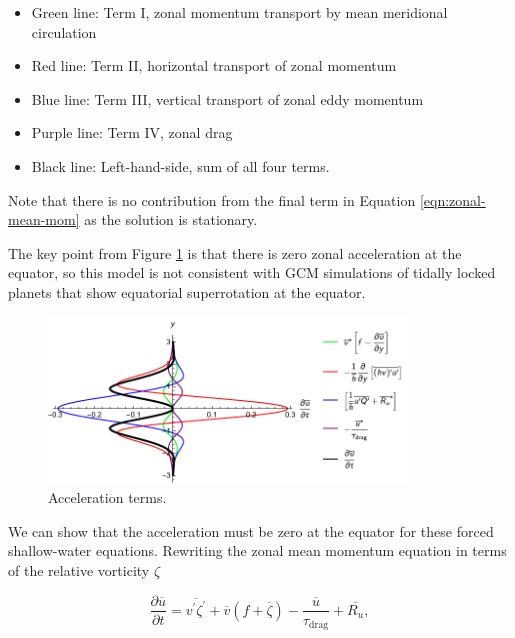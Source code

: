 \begin{itemize}
  \item Green line: Term I, zonal momentum transport by mean meridional circulation
  \item Red line: Term II, horizontal transport of zonal momentum
  \item Blue line: Term III, vertical transport of zonal eddy momentum
  \item Purple line: Term IV, zonal drag
  \item Black line: Left-hand-side, sum of all four terms.
\end{itemize}

Note that there is no contribution from the final term in Equation \ref{eqn:zonal-mean-mom} as the solution is stationary.

The key point from Figure \ref{fig:matsuno-zonal-acceleration-terms} is that there is zero zonal acceleration at the equator, so this model is not consistent with GCM simulations of tidally locked planets that show equatorial superrotation at the equator.

\begin{figure}
  \centering
  \includegraphics[width=0.85\textwidth]{figures/wave-mean-flow/matsuno-zonal-acceleration-terms.pdf}
  \caption{Acceleration terms.}
  \label{fig:matsuno-zonal-acceleration-terms}
\end{figure}


We can show that the acceleration must be zero at the equator for these forced shallow-water equations. Rewriting the zonal mean momentum equation in terms of the relative vorticity $\zeta$ \citep{thuburn1999zonalmean} \citep{showman2011superrotation}

\begin{equation}
  \frac { \partial \overline { u } } { \partial t } = \overline { v ^ { \prime } \zeta ^ { \prime } } + \overline { v } ( f + \overline { \zeta } ) - \frac { \overline { u } } { \tau _ { \mathrm { drag } } } + \overline { R _ { u } },
\end{equation}

